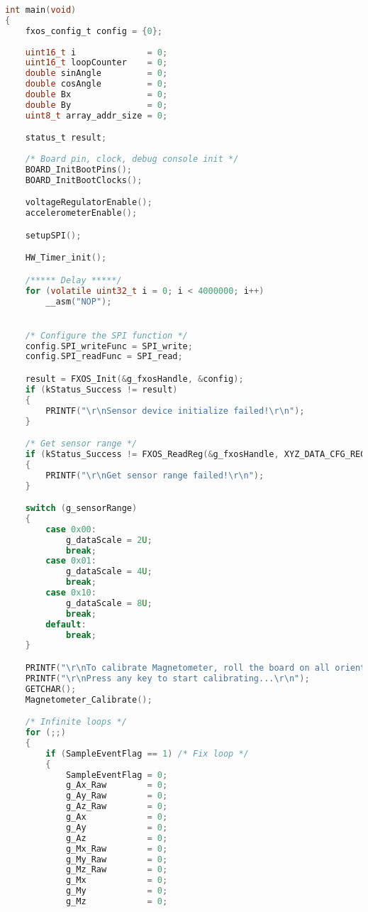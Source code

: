 \begin{lstlisting}[language=c,caption=Problem 5 main, label=list:p5_main]
int main(void)
{
    fxos_config_t config = {0};
    
    uint16_t i              = 0;
    uint16_t loopCounter    = 0;
    double sinAngle         = 0;
    double cosAngle         = 0;
    double Bx               = 0;
    double By               = 0;
    uint8_t array_addr_size = 0;

    status_t result;
    
    /* Board pin, clock, debug console init */
    BOARD_InitBootPins();
    BOARD_InitBootClocks();

    voltageRegulatorEnable();
    accelerometerEnable();

    setupSPI();

    HW_Timer_init();

    /***** Delay *****/
    for (volatile uint32_t i = 0; i < 4000000; i++)
        __asm("NOP");


    /* Configure the SPI function */
    config.SPI_writeFunc = SPI_write;
    config.SPI_readFunc = SPI_read;

    result = FXOS_Init(&g_fxosHandle, &config);
    if (kStatus_Success != result)
    {
        PRINTF("\r\nSensor device initialize failed!\r\n");
    }

    /* Get sensor range */
    if (kStatus_Success != FXOS_ReadReg(&g_fxosHandle, XYZ_DATA_CFG_REG, &g_sensorRange, 1))
    {
        PRINTF("\r\nGet sensor range failed!\r\n");
    }

    switch (g_sensorRange)
    {
        case 0x00:
            g_dataScale = 2U;
            break;
        case 0x01:
            g_dataScale = 4U;
            break;
        case 0x10:
            g_dataScale = 8U;
            break;
        default:
            break;
    }

    PRINTF("\r\nTo calibrate Magnetometer, roll the board on all orientations to get max and min values\r\n");
    PRINTF("\r\nPress any key to start calibrating...\r\n");
    GETCHAR();
    Magnetometer_Calibrate();

    /* Infinite loops */
    for (;;)
    {
        if (SampleEventFlag == 1) /* Fix loop */
        {
            SampleEventFlag = 0;
            g_Ax_Raw        = 0;
            g_Ay_Raw        = 0;
            g_Az_Raw        = 0;
            g_Ax            = 0;
            g_Ay            = 0;
            g_Az            = 0;
            g_Mx_Raw        = 0;
            g_My_Raw        = 0;
            g_Mz_Raw        = 0;
            g_Mx            = 0;
            g_My            = 0;
            g_Mz            = 0;


\end{lstlisting}
